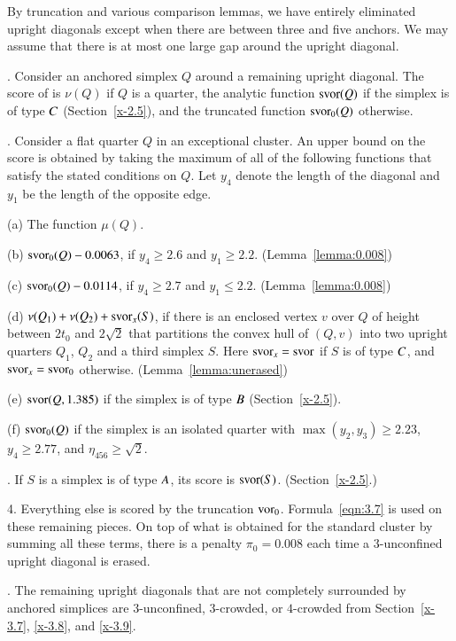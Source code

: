 \smallskip
By truncation and various comparison lemmas, we have entirely eliminated
upright diagonals except when there are between three and five anchors.
We may assume that there is at most one large gap around the upright
diagonal.

.  Consider an anchored simplex $Q$ around a remaining upright
diagonal. The score of is $\nu(Q)$ if $Q$ is a quarter, the
analytic function $\operatorname{svor}(Q)$ if the simplex is of type $C$
(Section~\ref{x-2.5}), and the truncated function $\operatorname{svor}_0(Q)$
otherwise.

.  Consider a flat quarter $Q$ in an exceptional cluster. An
upper bound on the score is obtained by taking the maximum of all
of the following functions that satisfy the stated conditions on
$Q$.  Let $y_4$ denote the length of the diagonal and $y_1$ be the
length of the opposite edge.

(a)  The function $\mu(Q)$.

(b)  $\operatorname{svor}_0(Q) - 0.0063$, if $y_4\ge 2.6$ and $y_1\ge
2.2$.\hfill
    (Lemma~\ref{lemma:0.008})

(c)  $\operatorname{svor}_0(Q) - 0.0114$, if $y_4\ge 2.7$ and $y_1\le 2.2$.
    \hfill (Lemma~\ref{lemma:0.008})

(d)  $\nu(Q_1)+\nu(Q_2)+\operatorname{svor}_x(S)$, if there is an enclosed
vertex
    $v$ over $Q$ of height between $2t_0$ and $2\sqrt{2}$ that
    partitions the convex hull of $(Q,v)$ into two upright quarters
    $Q_1$, $Q_2$ and a third simplex $S$. Here $\operatorname{svor}_x=\operatorname{svor}$
    if $S$ is of type $C$, and $\operatorname{svor}_x=\operatorname{svor}_0$ otherwise.
    \hfill (Lemma~\ref{lemma:unerased})

(e)  $\operatorname{svor}(Q,1.385)$ if the simplex is of type $B$
(Section~\ref{x-2.5}).

(f) $\operatorname{svor}_0(Q)$ if the simplex is an isolated quarter with
    $\max(y_2,y_3)\ge2.23$, $y_4\ge2.77$,
    and $\eta_{456}\ge\sqrt2$.

.   If $S$ is a simplex is of type $A$, its score is
$\operatorname{svor}(S)$. (Section~\ref{x-2.5}.)

\smallskip

4.  Everything else is scored by the truncation $\operatorname{vor}_0$.
    Formula~\ref{eqn:3.7} is used on these remaining pieces.
    On top of what is obtained for the standard cluster by summing all
these terms, there is a penalty $\pi_0=0.008$ each time a
$3$-unconfined upright diagonal is erased.

.  The remaining upright diagonals that are not completely
surrounded by anchored simplices are $3$-unconfined, $3$-crowded,
or $4$-crowded from Section~\ref{x-3.7}, \ref{x-3.8},  and
\ref{x-3.9}.


